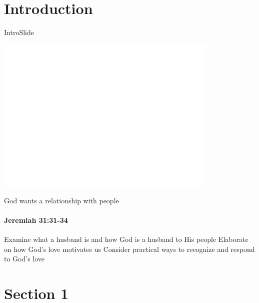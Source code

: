 
\section{Introduction}

\begin{frame}{IntroSlide}
\begin{center}
	\includegraphics[draft, width=0.8\textwidth]{figures/dummy.png}
\end{center}

\end{frame}

\begin{frame}{God wants a relationship with people}
\framesubtitle{Jeremiah 31:31-34}
	
\end{frame}

\begin{goals}
\goal Examine what a husband is and how God is a husband to His people
\goal Elaborate on how God's love motivates us
\goal Consider practical ways to recognize and respond to God's love

\end{goals}

\section{Section 1}

